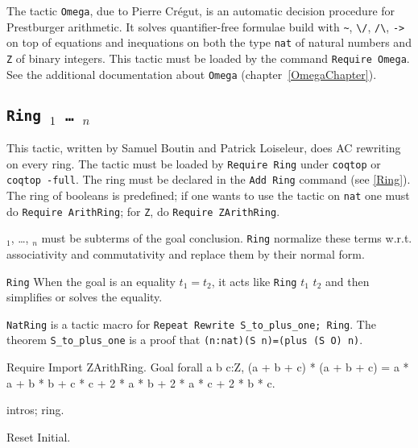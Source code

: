 The tactic \texttt{Omega}, due to Pierre Cr{\'e}gut,
is an automatic decision procedure for Prestburger
arithmetic. It solves quantifier-free 
formulae build with \verb|~|, \verb|\/|, \verb|/\|,
\verb|->| on top of equations and inequations on
both the type \texttt{nat} of natural numbers and \texttt{Z} of binary
integers. This tactic must be loaded by the command \texttt{Require
  Omega}. See the additional documentation about \texttt{Omega}
(chapter~\ref{OmegaChapter}).

\subsection{\tt Ring \term$_1$ \dots\ \term$_n$}

This tactic, written by Samuel Boutin and Patrick Loiseleur, 
does AC rewriting on every
ring. The tactic must be loaded by \texttt{Require Ring} under
\texttt{coqtop} or \texttt{coqtop -full}.
The ring must be declared in the \texttt{Add Ring}
command (see \ref{Ring}). The ring of booleans is predefined; if one
wants to use the tactic on \texttt{nat} one must do \texttt{Require
  ArithRing}; for \texttt{Z}, do \texttt{Require ZArithRing}.

\term$_1$, \dots, \term$_n$ must be subterms of the goal
conclusion. \texttt{Ring} normalize these terms
w.r.t. associativity and commutativity and replace them by their
normal form.

\begin{Variants}
\item \texttt{Ring} When the goal is an equality $t_1=t_2$, it
  acts like \texttt{Ring} $t_1$ $t_2$ and then simplifies or solves
  the equality.

\item \texttt{NatRing} is a tactic macro for \texttt{Repeat Rewrite
    S\_to\_plus\_one; Ring}. The theorem \texttt{S\_to\_plus\_one} is a
  proof that \texttt{(n:nat)(S n)=(plus (S O) n)}.

\end{Variants}

\Example
\begin{coq_example*}
Require Import ZArithRing.
Goal
forall a b c:Z,
  (a + b + c) * (a + b + c) =
  a * a + b * b + c * c + 2 * a * b + 2 * a * c + 2 * b * c.
\end{coq_example*}
\begin{coq_example}
intros; ring.
\end{coq_example}
\begin{coq_eval}
Reset Initial.
\end{coq_eval}

